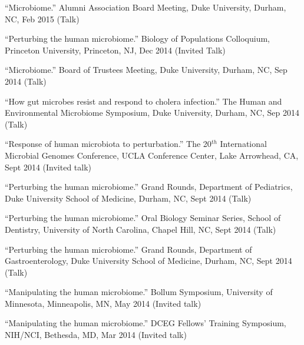 \documentclass[overlapped,line,11pt]{res}
\begin{document}
\begin{resume}
\begin{revnumerate}[39]
\item {``Microbiome.''
  Alumni Association Board Meeting, Duke University,
  Durham, NC, Feb 2015
  (Talk)}
\vspace*{0mm}

\item {``Perturbing the human microbiome.''
  Biology of Populations Colloquium, Princeton University, Princeton, NJ, Dec 2014
  (Invited Talk)}
\vspace*{0mm}

\item {``Microbiome.''
  Board of Trustees Meeting, Duke University,
  Durham, NC, Sep 2014
  (Talk)}
\vspace*{0mm}

\item {``How gut microbes resist and respond to cholera infection.''
  The Human and Environmental Microbiome Symposium, Duke University,
  Durham, NC, Sep 2014
  (Talk)}
\vspace*{0mm}

\item {``Response of human microbiota to perturbation.''
  The 20$^{th}$ International Microbial Genomes Conference, UCLA
  Conference Center, Lake Arrowhead, CA, Sept 2014
  (Invited talk)}
\vspace*{0mm}

\item {``Perturbing the human microbiome.''
  Grand Rounds, Department of Pediatrics, Duke University School of
  Medicine, Durham, NC, Sept 2014
  (Talk)}
\vspace*{0mm}

\item {``Perturbing the human microbiome.''
  Oral Biology Seminar Series, School of Dentistry, University of
  North Carolina, Chapel Hill, NC, Sept 2014
  (Talk)}
\vspace*{0mm}

\item {``Perturbing the human microbiome.''
  Grand Rounds, Department of Gastroenterology, Duke University School of
  Medicine, Durham, NC, Sept 2014
  (Talk)}
\vspace*{0mm}

\item {``Manipulating the human microbiome.''
  Bollum Symposium, University of Minnesota, Minneapolis, MN, May 2014
  (Invited talk)}
\vspace*{0mm}

\item {``Manipulating the human microbiome.''
  DCEG Fellows’ Training Symposium, NIH/NCI, Bethesda, MD, Mar 2014
  (Invited talk)}
\vspace*{0mm}


\end{revnumerate}
\end{resume}
\end{document}
